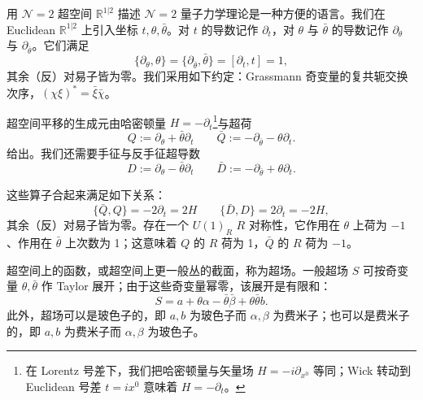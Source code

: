 用 $\mathcal{N}=2$ 超空间 $\mathbb{R}^{1|2}$ 描述 $\mathcal{N}=2$ 量子力学理论是一种方便的语言。我们在 Euclidean $\mathbb{R}^{1|2}$ 上引入坐标 $t,\theta,\bar\theta$。对 $t$ 的导数记作 $\partial_t$，对 $\theta$ 与 $\bar\theta$ 的导数记作 $\partial_\theta$ 与 $\partial_{\bar\theta}$。它们满足
\begin{equation}\tag{B.1}
\{\partial_\theta,\theta\} = \{\partial_{\bar\theta},\bar\theta\} = [\partial_t,t] = 1,
\end{equation}
其余（反）对易子皆为零。我们采用如下约定：Grassmann 奇变量的复共轭交换次序，$(\chi\xi)^*=\bar\xi\bar\chi$。

超空间平移的生成元由哈密顿量 $H=-\partial_t$\footnote{在 Lorentz 号差下，我们把哈密顿量与矢量场 $H=-i\partial_{x^0}$ 等同；Wick 转动到 Euclidean 号差 $t=ix^0$ 意味着 $H=-\partial_t$。}与超荷
\begin{equation}\tag{B.2}
Q := \partial_\theta + \bar\theta\partial_t \qquad \bar Q := -\partial_{\bar\theta} - \theta\partial_t.
\end{equation}
给出。我们还需要手征与反手征超导数
\begin{equation}\tag{B.3}
D := \partial_\theta - \bar\theta\partial_t \qquad \bar D := -\partial_{\bar\theta} + \theta\partial_t.
\end{equation}

这些算子合起来满足如下关系：
\begin{equation}\tag{B.4}
\{\bar Q,Q\} = -2\partial_t = 2H \qquad \{\bar D,D\} = 2\partial_t = -2H,
\end{equation}
其余（反）对易子皆为零。存在一个 $U(1)_R$ $R$ 对称性，它作用在 $\theta$ 上荷为 $-1$、作用在 $\bar\theta$ 上次数为 1；这意味着 $Q$ 的 $R$ 荷为 1，$\bar Q$ 的 $R$ 荷为 $-1$。

超空间上的函数，或超空间上更一般丛的截面，称为超场。一般超场 $S$ 可按奇变量 $\theta,\bar\theta$ 作 Taylor 展开；由于这些奇变量幂零，该展开是有限和：
\begin{equation}\tag{B.5}
S = a + \theta\alpha - \bar\theta\bar\beta + \theta\bar\theta b.
\end{equation}
此外，超场可以是玻色子的，即 $a,b$ 为玻色子而 $\alpha,\beta$ 为费米子；也可以是费米子的，即 $a,b$ 为费米子而 $\alpha,\beta$ 为玻色子。

